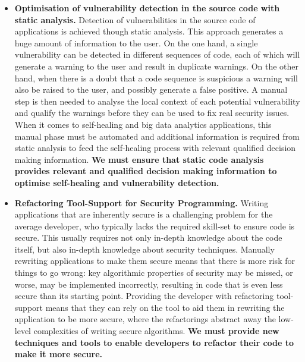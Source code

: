 \documentclass[a4paper,11pt]{article}
\begin{document}
\begin{itemize}
\item {\textbf{Optimisation of vulnerability detection in the source code with static analysis.}} Detection of vulnerabilities in the source code of applications is achieved though static analysis. This approach generates a huge amount of information to the user. On the one hand, a single vulnerability can be detected in different sequences of code, each of which will generate a warning to the user and result in duplicate warnings. On the other hand, when there is a doubt that a code sequence is suspicious a warning will also be raised to the user, and possibly generate a false positive. A manual step is then needed to analyse the local context of each potential vulnerability and qualify the warnings before they can be used to fix real security issues. When it comes to 
self-healing and big data analytics applications, this manual phase must be automated and additional information is required from static analysis to feed the self-healing process with relevant qualified decision making information.
\textbf{We must ensure that static code analysis provides relevant and qualified decision making information to optimise self-healing and vulnerability detection.} 

\item \textbf{Refactoring Tool-Support for Security Programming.}
Writing applications that are inherently secure is a challenging problem for the average developer, who typically lacks the required skill-set to ensure code is secure. This usually requires not only in-depth knowledge about the code itself, but also in-depth knowledge about security techniques. Manually rewriting applications to make them secure means that there is more risk for things to go wrong: key algorithmic properties of security may be missed, or worse, may be implemented incorrectly, resulting in code that is even less secure than its starting point. Providing the developer with refactoring tool-support means that they can rely on the tool to aid them in rewriting the application to be more secure, where the refactorings abstract away the low-level complexities of writing secure algorithms. 
\textbf{We must provide new techniques and tools to enable developers to refactor their code to make it more secure.}


\end{itemize}
\end{document}
